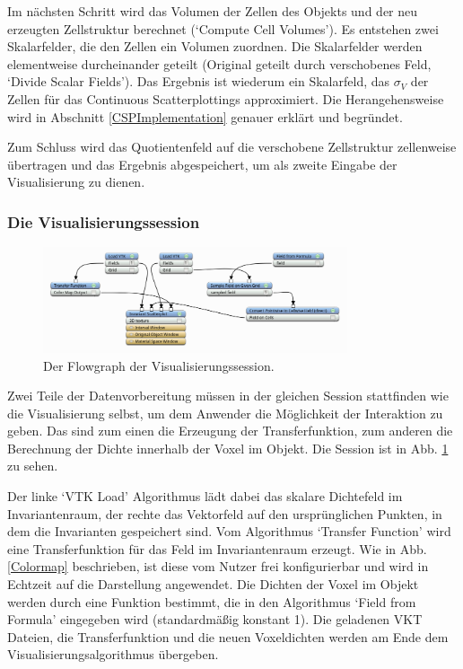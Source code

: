 \documentclass[a4paper,fontsize=12pt,toc=bib,halfparskip]{scrartcl}
\begin{document}
Im n\"achsten Schritt wird das Volumen der Zellen des Objekts und der neu erzeugten Zellstruktur berechnet (`Compute Cell Volumes'). Es entstehen zwei Skalarfelder, die den Zellen ein Volumen zuordnen. Die Skalarfelder werden elementweise durcheinander geteilt (Original geteilt durch verschobenes Feld, `Divide Scalar Fields'). Das Ergebnis ist wiederum ein Skalarfeld, das $\sigma_V$ der Zellen f\"ur das Continuous Scatterplottings approximiert. Die Herangehensweise wird in Abschnitt \ref{CSPImplementation} genauer erkl\"art und begr\"undet.

Zum Schluss wird das Quotientenfeld auf die verschobene Zellstruktur zellenweise \"ubertragen und das Ergebnis abgespeichert, um als zweite Eingabe der Visualisierung zu dienen.

\subsubsection{Die Visualisierungssession}
\begin{figure}
	\centering
	\includegraphics[width=0.8\textwidth]{pictures/VisSession.png}
	\caption{Der Flowgraph der Visualisierungssession.}
	\label{VisualizationSession}
\end{figure}

Zwei Teile der Datenvorbereitung m\"ussen in der gleichen Session stattfinden wie die Visualisierung selbst, um dem Anwender die M\"oglichkeit der Interaktion zu geben. Das sind zum einen die Erzeugung der Transferfunktion, zum anderen die Berechnung der Dichte innerhalb der Voxel im Objekt. Die Session ist in Abb. \ref{VisualizationSession} zu sehen.

Der linke `VTK Load' Algorithmus l\"adt dabei das skalare Dichtefeld im Invariantenraum, der rechte das Vektorfeld auf den urspr\"unglichen Punkten, in dem die Invarianten gespeichert sind. Vom Algorithmus `Transfer Function' wird eine Transferfunktion f\"ur das Feld im Invariantenraum erzeugt. Wie in Abb. \ref{Colormap} beschrieben, ist diese vom Nutzer frei konfigurierbar und wird in Echtzeit auf die Darstellung angewendet. Die Dichten der Voxel im Objekt werden durch eine Funktion bestimmt, die in den Algorithmus `Field from Formula' eingegeben wird (standardm\"a{\ss}ig konstant 1). Die geladenen VKT Dateien, die Transferfunktion und die neuen Voxeldichten werden am Ende dem Visualisierungsalgorithmus \"ubergeben.
\end{document}
